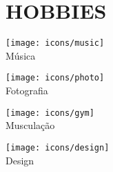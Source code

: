 \section*{\MakeUppercase{Hobbies}}

\begin{minipage}[t]{.15\textwidth}
	\centering
	\vbox{\texttt{[image: icons/music]}\\[4pt]Música}
\end{minipage}
\begin{minipage}[t]{.15\textwidth}
	\centering
	\vbox{\texttt{[image: icons/photo]}\\[4pt]Fotografia}	
\end{minipage}
\begin{minipage}[t]{.15\textwidth}
	\centering
	\vbox{\texttt{[image: icons/gym]}\\[4pt]Musculação}
\end{minipage}
\begin{minipage}[t]{.15\textwidth}
	\centering
	\vbox{\texttt{[image: icons/design]}\\[4pt]Design}	
\end{minipage}
